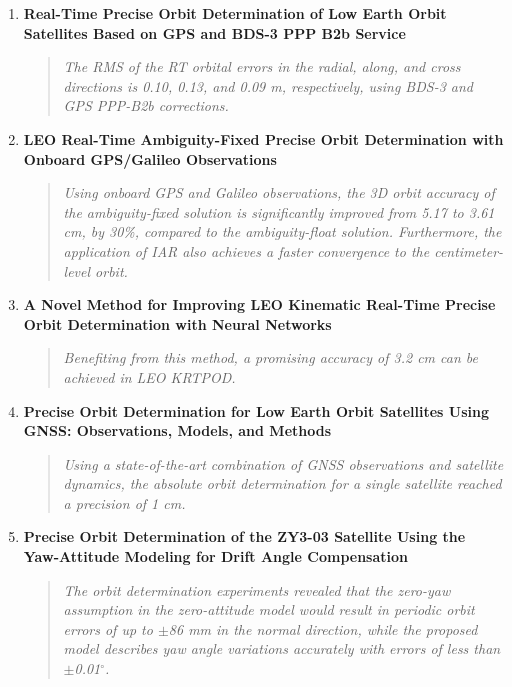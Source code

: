 \documentclass[a4paper,10pt]{article}
\begin{document}
\begin{enumerate}[label=\textbf{\arabic{enumi}.}, leftmargin=0.5in]

    \item \textbf{Real-Time Precise Orbit Determination of Low Earth Orbit Satellites Based on GPS and BDS-3 PPP B2b Service} \cite{shi2024real}
    \begin{quote}
        \textit{The RMS of the RT orbital errors in the radial, along, and cross directions is 0.10, 0.13, and 0.09 m, respectively, using BDS-3 and GPS PPP-B2b corrections.}
    \end{quote}
    
    \item \textbf{LEO Real-Time Ambiguity-Fixed Precise Orbit Determination with Onboard GPS/Galileo Observations} \cite{li2024leo}
    \begin{quote}
        \textit{Using onboard GPS and Galileo observations, the 3D orbit accuracy of the ambiguity-fixed solution is significantly improved from 5.17 to 3.61 cm, by 30\%, compared to the ambiguity-float solution. Furthermore, the application of IAR also achieves a faster convergence to the centimeter-level orbit.}
    \end{quote}
    
    \item \textbf{A Novel Method for Improving LEO Kinematic Real-Time Precise Orbit Determination with Neural Networks} \cite{zhang2024novel}
    \begin{quote}
        \textit{Benefiting from this method, a promising accuracy of 3.2 cm can be achieved in LEO KRTPOD.}
    \end{quote}

    \item \textbf{Precise Orbit Determination for Low Earth Orbit Satellites Using GNSS: Observations, Models, and Methods} \cite{mao2024precise}
    \begin{quote}
        \textit{Using a state-of-the-art combination of GNSS observations and satellite dynamics, the absolute orbit determination for a single satellite reached a precision of 1 cm.}
    \end{quote}

    \item \textbf{Precise Orbit Determination of the ZY3-03 Satellite Using the Yaw-Attitude Modeling for Drift Angle Compensation} \cite{gong2024precise}
    \begin{quote}
        \textit{The orbit determination experiments revealed that the zero-yaw assumption in the zero-attitude model would result in periodic orbit errors of up to $\pm$86 mm in the normal direction, while the proposed model describes yaw angle variations accurately with errors of less than $\pm$0.01$^\circ$.}
    \end{quote}
    

\end{enumerate}
\end{document}
